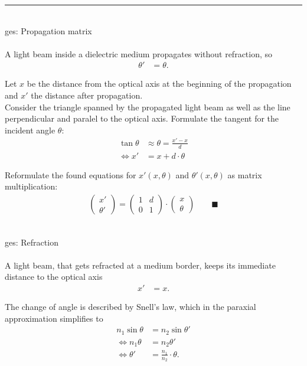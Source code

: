 \documentclass{article}
\begin{document}
{\color{violet}
\hrule
	\\
	ges: Propagation matrix\\
	\\
	A light beam inside a dielectric medium propagates without refraction, so
		\begin{align*}
			\theta' &= \theta.
		\end{align*}
	
	Let $x$ be the distance from the optical axis at the beginning of the propagation and $x'$ the distance after propagation.\\
	Consider the triangle spanned by the propagated light beam as well as the line perpendicular and paralel to the optical axis. Formulate the tangent for the incident angle $\theta$:
		\begin{align*}
			\tan\theta &\approx \theta = \frac{x'-x}{d} \\
			\Leftrightarrow x' &= x + d \cdot \theta
		\end{align*}
	
	Reformulate the found equations for $x'(x,\theta)$ and $\theta'(x,\theta)$ as matrix multiplication:
		\begin{align*}
			\begin{pmatrix}
				x' \\ \theta'
			\end{pmatrix}
			=
			\begin{pmatrix}
				1 & d \\
				0 & 1
			\end{pmatrix}
			\cdot
			\begin{pmatrix}
				x \\ \theta
			\end{pmatrix}
			\qquad \blacksquare
		\end{align*}


	\\
	ges: Refraction\\
	\\
	A light beam, that gets refracted at a medium border, keeps its immediate distance to the optical axis
		\begin{align*}
			x' &= x.
		\end{align*}
	
	The change of angle is described by Snell's law, which in the paraxial approximation simplifies to
		\begin{align*}
			n_1 \sin\theta &= n_2 \sin\theta' \\
			\Leftrightarrow n_1 \theta &= n_2 \theta' \\
			\Leftrightarrow \theta' &= \frac{n_1}{n_2} \cdot \theta.
		\end{align*}

}
\end{document}
